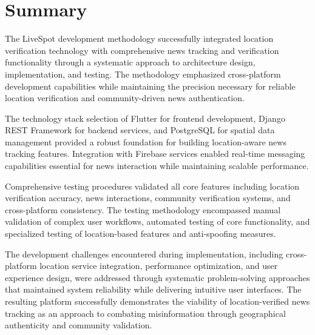 \section{Summary}
\label{sec:methodology-summary}

The LiveSpot development methodology successfully integrated location verification technology with comprehensive news tracking and verification functionality through a systematic approach to architecture design, implementation, and testing. The methodology emphasized cross-platform development capabilities while maintaining the precision necessary for reliable location verification and community-driven news authentication.

The technology stack selection of Flutter for frontend development, Django REST Framework for backend services, and PostgreSQL for spatial data management provided a robust foundation for building location-aware news tracking features. Integration with Firebase services enabled real-time messaging capabilities essential for news interaction while maintaining scalable performance.

Comprehensive testing procedures validated all core features including location verification accuracy, news interactions, community verification systems, and cross-platform consistency. The testing methodology encompassed manual validation of complex user workflows, automated testing of core functionality, and specialized testing of location-based features and anti-spoofing measures.

The development challenges encountered during implementation, including cross-platform location service integration, performance optimization, and user experience design, were addressed through systematic problem-solving approaches that maintained system reliability while delivering intuitive user interfaces. The resulting platform successfully demonstrates the viability of location-verified news tracking as an approach to combating misinformation through geographical authenticity and community validation. 

